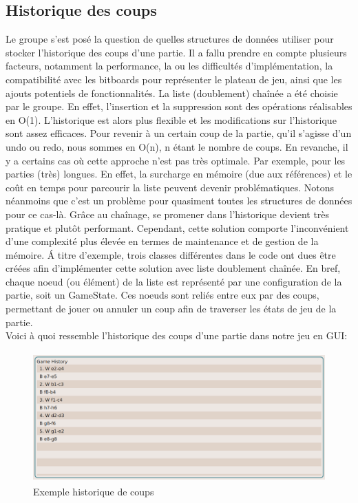 \documentclass{article}
\begin{document}
\subsection{Historique des coups}
\par Le groupe s'est posé la question de quelles structures de données utiliser pour stocker l'historique des coups d'une
partie. Il a fallu prendre en compte plusieurs facteurs, notamment la performance, la ou les difficultés d'implémentation,
la compatibilité avec les bitboards pour représenter le plateau de jeu, ainsi que les ajouts potentiels de fonctionnalités.
La liste (doublement) chaînée a été choisie par le groupe. En effet, l'insertion et la suppression sont des opérations
réalisables en O(1). L'historique est alors plus flexible et les modifications sur l'historique sont assez efficaces.
Pour revenir à un certain coup de la partie, qu'il s'agisse d'un undo ou redo, nous sommes en O(n), n étant le nombre de coups.
En revanche, il y a certains cas où cette approche n'est pas très optimale. Par exemple, pour les parties (très) longues.
En effet, la surcharge en mémoire (due aux références) et le coût en temps pour parcourir la liste peuvent
devenir problématiques. Notons néanmoins que c'est un problème pour quasiment toutes les structures de données pour ce cas-là.
Grâce au chaînage, se promener dans l'historique devient très pratique et plutôt performant. Cependant, cette solution comporte
l'inconvénient d'une complexité plus élevée en termes de maintenance et de gestion de la mémoire. \'A titre d'exemple,
trois classes différentes dans le code ont dues être créées afin d'implémenter cette solution avec liste doublement chaînée.
En bref, chaque noeud (ou élément) de la liste est représenté par une configuration de la partie, soit un GameState.
Ces noeuds sont reliés entre eux par des coups, permettant de jouer ou annuler un coup afin de traverser les états de jeu
de la partie.\\
Voici à quoi ressemble l'historique des coups d'une partie dans notre jeu en GUI:\\

\begin{figure}[h]
    \caption{Exemple historique de coups}
    \centering
    \includegraphics[width=\textwidth,height=5.0cm,keepaspectratio]{historique-coups}
\end{figure}
\end{document}
